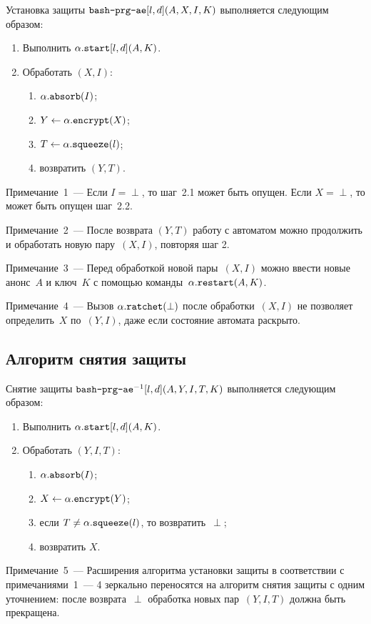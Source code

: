 Установка защиты $\texttt{bash-prg-ae}[l,d](A,X,I,K)$ выполняется следующим образом:
\begin{enumerate}
\item
Выполнить $\alpha.\texttt{start}[l,d](A,K)$.
\item
Обработать $(X,I)$:
\begin{enumerate}
\item
$\alpha.\texttt{absorb}(I)$;
\item
$Y\leftarrow\alpha.\texttt{encrypt}(X)$;
\item
$T\leftarrow \alpha.\texttt{squeeze}(l)$;
\item
возвратить $(Y,T)$.
\end{enumerate}
\end{enumerate}

\begin{note}
Примечание~1~--- 
Если $I=\perp$, то шаг~2.1 может быть опущен.
Если $X=\perp$, то может быть опущен шаг~2.2.
\end{note}

\begin{note}
Примечание~2~--- После возврата $(Y,T)$ работу с автоматом
можно продолжить и обработать новую пару~$(X,I)$, повторяя шаг 2.
\end{note}

\begin{note}
Примечание~3~--- Перед обработкой новой пары~$(X,I)$ можно ввести
новые анонс~$A$ и ключ~$K$ с помощью 
команды~$\alpha.\texttt{restart}(A, K)$.
\end{note}

\begin{note}
Примечание~4~--- Вызов $\alpha.\texttt{ratchet}(\perp)$
после обработки~$(X,I)$ не позволяет определить~$X$ по~$(Y,I)$,
даже если состояние автомата раскрыто. 
\end{note}

\subsection{Алгоритм снятия защиты}\label{PRG.AE.Unwrap}

Снятие защиты $\texttt{bash-prg-ae}^{-1}[l,d](A,Y,I,T,K)$ выполняется 
следующим образом:
\begin{enumerate}
\item
Выполнить $\alpha.\texttt{start}[l,d](A,K)$.
\item
Обработать $(Y,I,T)$:
\begin{enumerate}
\item
$\alpha.\texttt{absorb}(I)$;
\item
$X\leftarrow\alpha.\texttt{encrypt}(Y)$;
\item
если $T\neq\alpha.\texttt{squeeze}(l)$, то возвратить~$\perp$;
\item
возвратить $X$.
\end{enumerate}
\end{enumerate}

\begin{note}
Примечание~5~--- Расширения алгоритма установки защиты в соответствии 
с примечаниями~1~--- 4 зеркально переносятся на алгоритм снятия защиты
с одним уточнением: после возврата~$\perp$ обработка новых пар~$(Y,I,T)$
должна быть прекращена.
\end{note}
